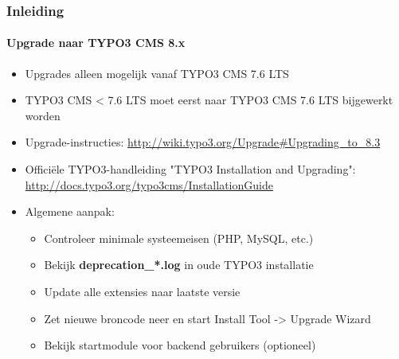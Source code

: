 \begin{frame}[fragile]
	\frametitle{Inleiding}
	\framesubtitle{Upgrade naar TYPO3 CMS 8.x}

	\begin{itemize}
		\item Upgrades alleen mogelijk vanaf TYPO3 CMS 7.6 LTS
		\item TYPO3 CMS < 7.6 LTS moet eerst naar TYPO3 CMS 7.6 LTS bijgewerkt worden
	\end{itemize}

	\begin{itemize}

		\item Upgrade-instructies:\newline
			\smaller\url{http://wiki.typo3.org/Upgrade#Upgrading_to_8.3}\normalsize
		\item Officiële TYPO3-handleiding "TYPO3 Installation and Upgrading":
			\smaller\url{http://docs.typo3.org/typo3cms/InstallationGuide}\normalsize
		\item Algemene aanpak:
			\begin{itemize}
				\item Controleer minimale systeemeisen \small(PHP, MySQL, etc.)
				\item Bekijk \textbf{deprecation\_*.log} in oude TYPO3 installatie
				\item Update alle extensies naar laatste versie
				\item Zet nieuwe broncode neer en start Install Tool -> Upgrade Wizard
				\item Bekijk startmodule voor backend gebruikers (optioneel)
			\end{itemize}
	\end{itemize}

\end{frame}


